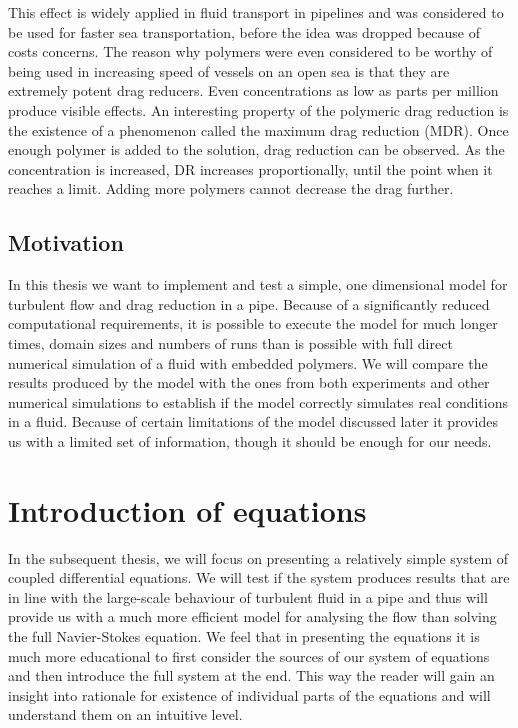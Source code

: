 \documentclass[11pt,a4paper]{article}
\begin{document}
This effect is widely applied in fluid transport in pipelines\cite{Graham04} and was considered to be used for faster sea transportation\cite{Dimotakis03}, before the idea was dropped because of costs concerns.
The reason why polymers were even considered to be worthy of being used in increasing speed of vessels on an open sea is that they are extremely potent drag reducers.
Even concentrations as low as parts per million produce visible effects.
An interesting property of the polymeric drag reduction is the existence of a phenomenon called the maximum drag reduction (MDR).
Once enough polymer is added to the solution, drag reduction can be observed.
As the concentration is increased, DR increases proportionally, until the point when it reaches a limit.
Adding more polymers cannot decrease the drag further.

\subsection{Motivation}
In this thesis we want to implement and test a simple, one dimensional model for turbulent flow and drag reduction in a pipe.
Because of a significantly reduced computational requirements, it is possible to execute the model for much longer times, domain sizes and numbers of runs than is possible with full direct numerical simulation of a fluid with embedded polymers.
We will compare the results produced by the model with the ones from both experiments and other numerical simulations to establish if the model correctly simulates real conditions in a fluid.
Because of certain limitations of the model discussed later it provides us with a limited set of information, though it should be enough for our needs.

\section{Introduction of equations}
In the subsequent thesis, we will focus on presenting a relatively simple system of coupled differential equations.
We will test if the system produces results that are in line with the large-scale behaviour of turbulent fluid in a pipe and thus will provide us with a much more efficient model for analysing the flow than solving the full Navier-Stokes equation.
We feel that in presenting the equations it is much more educational to first consider the sources of our system of equations and then introduce the full system at the end.
This way the reader will gain an insight into rationale for existence of individual parts of the equations and will understand them on an intuitive level.
\end{document}
